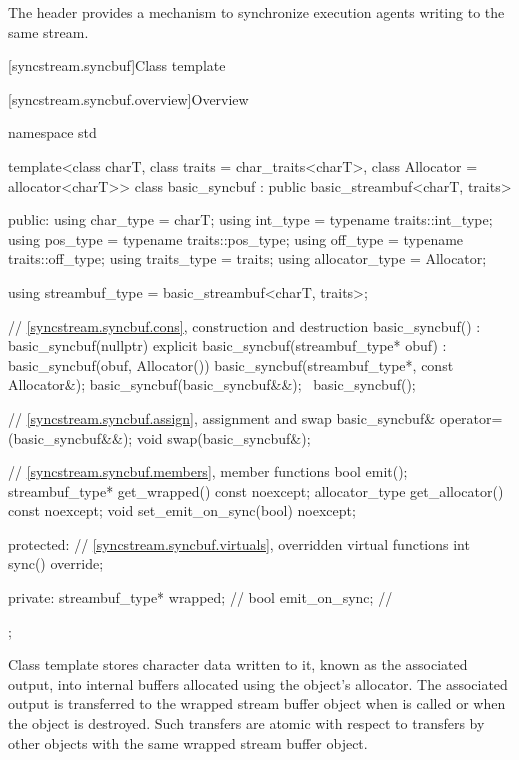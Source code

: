 \pnum
The header  provides a mechanism
to synchronize execution agents writing to the same stream.

[syncstream.syncbuf]{Class template }

[syncstream.syncbuf.overview]{Overview}

%
\begin{codeblock}
namespace std {
  template<class charT, class traits = char_traits<charT>, class Allocator = allocator<charT>>
  class basic_syncbuf : public basic_streambuf<charT, traits> {
  public:
    using char_type      = charT;
    using int_type       = typename traits::int_type;
    using pos_type       = typename traits::pos_type;
    using off_type       = typename traits::off_type;
    using traits_type    = traits;
    using allocator_type = Allocator;

    using streambuf_type = basic_streambuf<charT, traits>;

    // \ref{syncstream.syncbuf.cons}, construction and destruction
    basic_syncbuf()
      : basic_syncbuf(nullptr) {}
    explicit basic_syncbuf(streambuf_type* obuf)
      : basic_syncbuf(obuf, Allocator()) {}
    basic_syncbuf(streambuf_type*, const Allocator&);
    basic_syncbuf(basic_syncbuf&&);
    ~basic_syncbuf();

    // \ref{syncstream.syncbuf.assign}, assignment and swap
    basic_syncbuf& operator=(basic_syncbuf&&);
    void swap(basic_syncbuf&);

    // \ref{syncstream.syncbuf.members}, member functions
    bool emit();
    streambuf_type* get_wrapped() const noexcept;
    allocator_type get_allocator() const noexcept;
    void set_emit_on_sync(bool) noexcept;

  protected:
    // \ref{syncstream.syncbuf.virtuals}, overridden virtual functions
    int sync() override;

  private:
    streambuf_type* wrapped;    // \expos
    bool emit_on_sync{};        // \expos
  };
}
\end{codeblock}

\pnum
Class template  stores character data
written to it, known as the associated output, into internal
buffers allocated using the object's allocator.
The associated output is transferred to the
wrapped stream buffer object 
when  is called
or when the  object is destroyed.
Such transfers are atomic with respect to transfers
by other  objects
with the same wrapped stream buffer object.

